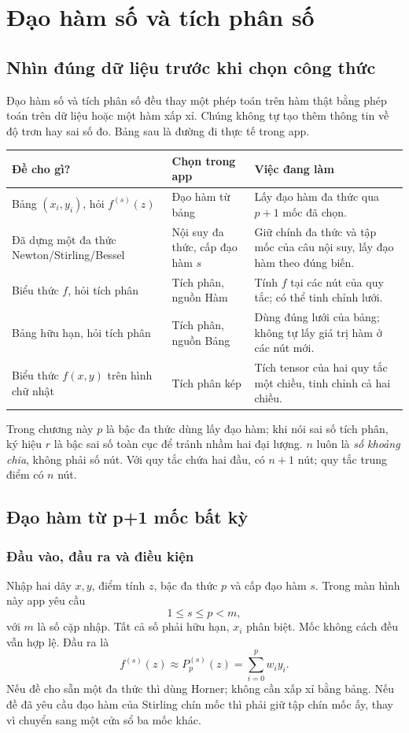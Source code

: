 \chapter{Đạo hàm số và tích phân số}
\label{ch:calculus}


\section{Nhìn đúng dữ liệu trước khi chọn công thức}
Đạo hàm số và tích phân số đều thay một phép toán trên hàm thật bằng phép toán trên dữ liệu hoặc một hàm xấp xỉ. Chúng không tự tạo thêm thông tin về độ trơn hay sai số đo. Bảng sau là đường đi thực tế trong app.
\begin{center}
\begin{tabular}{p{}p{}p{}}
\toprule
Đề cho gì? & Chọn trong app & Việc đang làm\\\midrule
Bảng $(x_i,y_i)$, hỏi $f^{(s)}(z)$ & Đạo hàm từ bảng & Lấy đạo hàm đa thức qua $p+1$ mốc đã chọn.\\
Đã dựng một đa thức Newton/Stirling/Bessel & Nội suy đa thức, cấp đạo hàm $s$ & Giữ chính đa thức và tập mốc của câu nội suy, lấy đạo hàm theo đúng biến.\\
Biểu thức $f$, hỏi tích phân & Tích phân, nguồn Hàm & Tính $f$ tại các nút của quy tắc; có thể tinh chỉnh lưới.\\
Bảng hữu hạn, hỏi tích phân & Tích phân, nguồn Bảng & Dùng đúng lưới của bảng; không tự lấy giá trị hàm ở các nút mới.\\
Biểu thức $f(x,y)$ trên hình chữ nhật & Tích phân kép & Tích tensor của hai quy tắc một chiều, tinh chỉnh cả hai chiều.\\\bottomrule
\end{tabular}
\end{center}

Trong chương này $p$ là bậc đa thức dùng lấy đạo hàm; khi nói sai số tích phân, ký hiệu $r$ là bậc sai số toàn cục để tránh nhầm hai đại lượng. $n$ luôn là \emph{số khoảng chia}, không phải số nút. Với quy tắc chứa hai đầu, có $n+1$ nút; quy tắc trung điểm có $n$ nút.

\section{Đạo hàm từ p+1 mốc bất kỳ}
\label{sec:derivative-weights}
\subsection{Đầu vào, đầu ra và điều kiện}
Nhập hai dãy $x,y$, điểm tính $z$, bậc đa thức $p$ và cấp đạo hàm $s$. Trong màn hình này app yêu cầu
\[
1\le s\le p<m,
\]
với $m$ là số cặp nhập. Tất cả số phải hữu hạn, $x_i$ phân biệt. Mốc không cách đều vẫn hợp lệ. Đầu ra là
\[
f^{(s)}(z)\approx P_p^{(s)}(z)=\sum_{i=0}^{p}w_i y_i.
\]
Nếu đề cho sẵn một đa thức thì dùng Horner; không cần xấp xỉ bằng bảng. Nếu đề đã yêu cầu đạo hàm của Stirling chín mốc thì phải giữ tập chín mốc ấy, thay vì chuyển sang một cửa sổ ba mốc khác.

